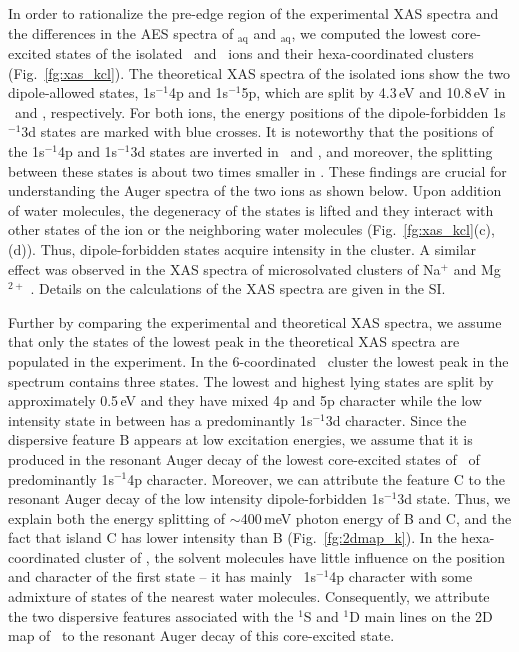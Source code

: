 In order to rationalize the pre-edge region of the experimental XAS spectra and the differences in the AES spectra of \ki$_{\text{aq}}$ and \cli$_{\text{aq}}$, we computed the lowest core-excited states of the isolated \ki~and \cli~ions and their hexa-coordinated clusters (Fig.\ \ref{fg:xas_kcl}). The theoretical XAS spectra of the isolated ions show the two dipole-allowed states, 1s$^{-1}$4p and 1s$^{-1}$5p, which are split by 4.3\,eV and 10.8\,eV in \ki~and \cli, respectively. For both ions, the energy positions of the dipole-forbidden 1s$^{-1}$3d states are marked with blue crosses. It is noteworthy that the positions of the 1s$^{-1}$4p and 1s$^{-1}$3d states are inverted in \ki~and \cli, and moreover, the splitting between these states is about two times smaller in \ki. These findings are crucial for understanding the Auger spectra of the two ions as shown below. Upon addition of water molecules, the degeneracy of the states is lifted and they interact with other states of the ion or the neighboring water molecules (Fig.\ \ref{fg:xas_kcl}(c),(d)). Thus, dipole-forbidden states acquire intensity in the cluster. A similar effect was observed in the XAS spectra of microsolvated clusters of Na$^{+}$ and Mg$^{2+}$ \citep{miteva16:16671}. Details on the calculations of the XAS spectra are given in the SI.


Further by comparing the experimental and theoretical XAS spectra, we assume that only the states of the lowest peak in the theoretical XAS spectra are populated in the experiment. In the 6-coordinated \ki~cluster the lowest peak in the spectrum contains three states. The lowest and highest lying states are split by approximately 0.5\,eV and they have mixed 4p and 5p character while the low intensity state in between has a predominantly 1s$^{-1}$3d character. Since the dispersive feature B appears at low excitation energies, we assume that it is produced in the resonant Auger decay of the lowest core-excited states of \ki~of predominantly 1s$^{-1}$4p character. Moreover, we can attribute the feature C to the resonant Auger decay of the low intensity dipole-forbidden 1s$^{-1}$3d state. Thus, we explain both the energy splitting of $\sim$400\,meV photon energy of B and C, and the fact that island C has lower intensity than B (Fig.\ \ref{fg:2dmap_k}). In the hexa-coordinated cluster of \cli, the solvent molecules have little influence on the position and character of the first state -- it has mainly \cli~1s$^{-1}$4p character with some admixture of states of the nearest water molecules. Consequently, we attribute the two dispersive features associated with the $^1$S and $^1$D main lines on the 2D map of \cli~to the resonant Auger decay of this core-excited state. %


